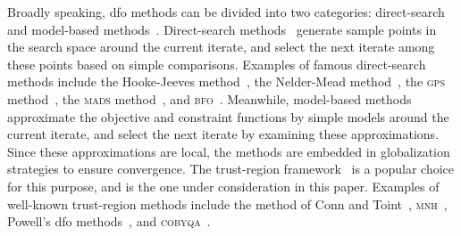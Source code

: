 \documentclass[draft]{article}
\numberwithin{equation}{section}
\theoremstyle{definition}
\theoremstyle{plain}
\newcommand{\solvername}[1]{\textsc{#1}\xspace}
\begin{document}
Broadly speaking, \gls{dfo} methods can be divided into two categories: direct-search and model-based methods~\cite{Conn_Scheinberg_Vicente_2009}.
Direct-search methods~\cite{Kolda_Lewis_Torczon_2003} generate sample points in the search space around the current iterate, and select the next iterate among these points based on simple comparisons.
Examples of famous direct-search methods include the Hooke-Jeeves method~\cite{Hooke_Jeeves_1961}, the Nelder-Mead method~\cite{Nelder_Mead_1965}, the \solvername{gps} method~\cite{Booker_Etal_1999}, the \solvername{mads} method~\cite{Audet_Dennis_2006}, and \solvername{bfo}~\cite{Porcelli_Toint_2017,Porcelli_Toint_2022}.
Meanwhile, model-based methods~\cite[Part~4]{Audet_Hare_2017} approximate the objective and constraint functions by simple models around the current iterate, and select the next iterate by examining these approximations.
Since these approximations are local, the methods are embedded in globalization strategies to ensure convergence.
The trust-region framework~\cite{Conn_Gould_Toint_2000} is a popular choice for this purpose, and is the one under consideration in this paper.
Examples of well-known trust-region methods include the method of Conn and Toint~\cite{Conn_Toint_1996}, \solvername{mnh}~\cite{Wild_2008}, Powell's \gls{dfo} methods~\cite{Powell_1994,Powell_2002,Powell_2006,Powell_2009}, and \solvername{cobyqa}~\cite{Ragonneau_2022,Ragonneau_Zhang_2023}.
\end{document}
